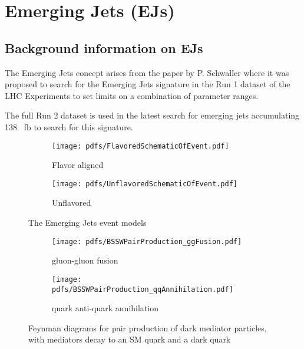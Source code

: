 \chapter{Emerging Jets (EJs) \label{ch:emj}}


\section{Background information on EJs}

The Emerging Jets concept arises from the paper by P. Schwaller \cite{Schwaller:2015gea} where it was proposed to search for the Emerging Jets signature in the Run 1 dataset of the LHC Experiments to set limits on a combination of parameter ranges.



The full Run 2 dataset is used in the latest search for emerging jets \cite{CMS:2024gxp} accumulating 138 \unit{\per\femto\barn} to search for this signature.



\begin{figure}
	\centering
	\begin{subfigure}{.45\linewidth}
		\texttt{[image: pdfs/FlavoredSchematicOfEvent.pdf]}
		\caption{Flavor aligned}
	\end{subfigure}
	\begin{subfigure}{.45\linewidth}
		\texttt{[image: pdfs/UnflavoredSchematicOfEvent.pdf]}
		\caption{Unflavored}
	\end{subfigure}
	\caption{The Emerging Jets event models}
	\label{fig:emj_production}
\end{figure}

\begin{figure}
	\begin{center}
		\begin{subfigure}{.45\linewidth}
			\texttt{[image: pdfs/BSSWPairProduction\_ggFusion.pdf]}
			\caption{gluon-gluon fusion}
		\end{subfigure}
		\begin{subfigure}{.45\linewidth}
			\texttt{[image: pdfs/BSSWPairProduction\_qqAnnihilation.pdf]}
			\caption{quark anti-quark annihilation}
		\end{subfigure}
	\end{center}
	\caption[Emergin jets production modes]{Feynman diagrams for pair production of dark mediator particles, with mediators decay to an SM quark and a dark quark}
\end{figure}

